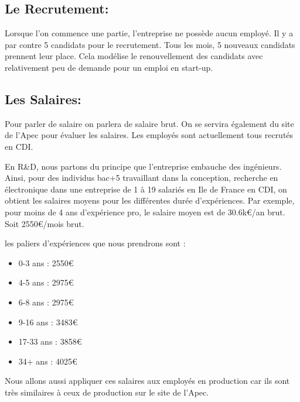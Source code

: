 \subsection{Le Recrutement:}



Lorsque l’on commence une partie, l’entreprise ne possède aucun employé. Il y a par contre 5 candidats pour le recrutement. Tous les mois, 5 nouveaux candidats prennent leur place. Cela modélise le renouvellement des candidats avec relativement peu de demande pour un emploi en start-up.



\subsection{Les Salaires:}



Pour parler de salaire on parlera de salaire brut. On se servira également du site de l’Apec pour évaluer les salaires. Les employés sont actuellement tous recrutés en CDI.

En R\&D, nous partons du principe que l’entreprise embauche des ingénieurs. Ainsi, pour des individus bac+5 travaillant dans la conception, recherche en électronique dans une entreprise de 1 à  19 salariés en Ile de France en CDI, on obtient les salaires moyens pour les différentes durée d'expériences. Par exemple, pour moins de 4 ans d'expérience pro, le salaire moyen est de 30.6k\euro{}/an brut. Soit 2550\euro{}/mois brut. 



les paliers d'expériences que nous prendrons sont :



\begin{itemize}
    \item[] 0-3 ans : 2550\euro{}
    \item[] 4-5 ans : 2975\euro{}
    \item[] 6-8 ans : 2975\euro{}
    \item[] 9-16 ans : 3483\euro{}
    \item[] 17-33 ans : 3858\euro{}
    \item[] 34$+$ ans : 4025\euro{}
\end{itemize}



Nous allons aussi appliquer ces salaires aux employés en production car ils sont très similaires à ceux de production sur le site de l’Apec.



